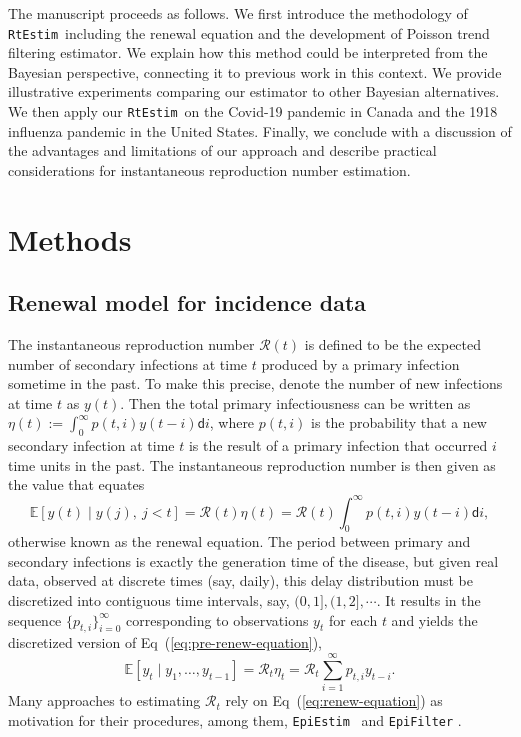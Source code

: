 \documentclass[10pt,letterpaper]{article}
\def\RtEstim{\texttt{RtEstim}}
\def\EpiEstim{\texttt{EpiEstim}}
\def\bbE{\mathbb{E}}
\def\calR{\mathcal{R}}
\def\diff{\mathsf{d}}
\renewcommand{\eqref}[1]{Eq~(\ref{#1})}
\begin{document}
The manuscript proceeds as follows. We first introduce the methodology of
\RtEstim\ including the renewal equation and the development of Poisson
trend filtering estimator. We explain how this method could be interpreted from
the Bayesian perspective, connecting it to previous work in this context. We
provide illustrative experiments comparing our estimator to other Bayesian alternatives. 
We then apply our \RtEstim\ on the Covid-19 pandemic in Canada and 
the 1918 influenza pandemic in the United States. Finally, we conclude 
with a discussion of the advantages and limitations of our approach and describe 
practical considerations for instantaneous reproduction number estimation.


\section{Methods}

\subsection{Renewal model for incidence data} 

The instantaneous reproduction number $\calR(t)$ is defined to be the expected
number of secondary infections at time $t$ produced by a primary infection
sometime in the past. To make this precise, denote the number of new infections
at time $t$ as $y(t)$. Then the total primary infectiousness can be written as
$\eta(t) := \int_0^{\infty} p(t,i) y(t-i) \diff i$, where $p(t,i)$ is the
probability that a new secondary infection at time $t$ is the result of a primary infection
that occurred $i$ time units in the past. The instantaneous reproduction number is then given
as the value that equates
\begin{equation} \label{eq:pre-renew-equation}
  \bbE[y(t) \mid y(j),\ j<t]=\calR(t)\eta(t)=\calR(t)\int_0^\infty p(t,i)y(t-i)\diff i,
\end{equation}
otherwise known as the renewal equation. The period between primary and secondary
infections is exactly the generation time of the disease, but given real data,
observed at discrete times (say, daily), this delay distribution must be discretized
into contiguous time intervals,
say, $(0,1], (1,2], \cdots$. It results in the sequence $\{p_{t,i}\}_{i=0}^\infty$
corresponding to observations $y_t$ for each $t$ and yields the
discretized version of \eqref{eq:pre-renew-equation},
\begin{equation} \label{eq:renew-equation}
  \bbE[y_t \mid y_1,\ldots,y_{t-1}]=\calR_t\eta_t=\calR_t\sum_{i = 1}^\infty p_{t,i} y_{t-i}.
\end{equation}
Many approaches to estimating $\calR_t$ rely on \eqref{eq:renew-equation} as
motivation for their procedures, among them, \EpiEstim\ \cite{cori2013new} 
and \texttt{EpiFilter} \cite{parag2021improved}. 
\end{document}
